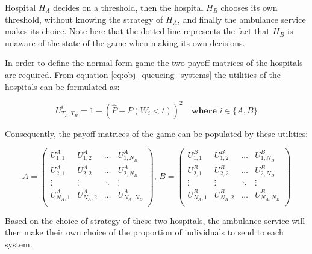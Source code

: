 Hospital \(H_A\) decides on a threshold, then the hospital \(H_B\)
chooses its own threshold, without knowing the strategy of \(H_A\), and finally
the ambulance service makes its choice. 
Note here that the dotted line represents the
fact that \(H_B\) is unaware of the state of the game when making its own 
decisions. 

In order to define the normal form game the two payoff matrices of the hospitals 
are required. From equation \ref{eq:obj_queueing_systems} the utilities of the
hospitals can be formulated as:

\begin{equation} \label{eq:payoff_entry}
    U_{T_A, T_B}^i = 1 - \left( 
        \hat{P} - P(W_i < t) 
    \right)^2 \quad \textbf{where } i \in \{A, B\}
\end{equation}

Consequently, the payoff matrices of the game can be populated by these 
utilities:

\begin{equation} \label{eq:payoff_matrices}
    A = 
    \begin{pmatrix}
        U_{1,1}^A & U_{1,2}^A & \dots & U_{1,N_B}^A \\
        U_{2,1}^A & U_{2,2}^A & \dots & U_{2,N_B}^A \\
        \vdots & \vdots & \ddots & \vdots \\
        U_{N_A,1}^A & U_{N_A,2}^A & \dots & U_{N_A,N_B}^A \\
    \end{pmatrix}, \,
    B = 
    \begin{pmatrix}
        U_{1,1}^B & U_{1,2}^B & \dots & U_{1,N_B}^B \\
        U_{2,1}^B & U_{2,2}^B & \dots & U_{2,N_B}^B \\
        \vdots & \vdots & \ddots & \vdots \\
        U_{N_A,1}^B & U_{N_A,2}^B & \dots & U_{N_A,N_B}^B \\
    \end{pmatrix}
\end{equation}

Based on the choice of strategy of these two hospitals, the ambulance service 
will then 
make their own choice of the proportion of individuals to send to each system.




